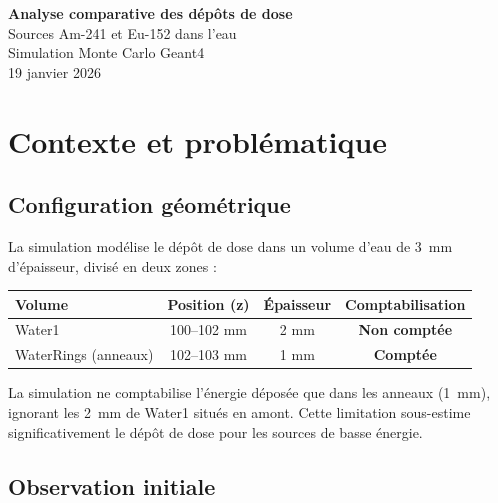 \documentclass[11pt,a4paper]{article}
\begin{document}
\begin{center}
    {\LARGE\bfseries Analyse comparative des dépôts de dose}\\[0.4cm]
    {\Large Sources Am-241 et Eu-152 dans l'eau}\\[0.5cm]
    {\large Simulation Monte Carlo Geant4}\\[0.3cm]
    {\large 19 janvier 2026}
\end{center}

\vspace{0.5cm}

\tableofcontents

\newpage

\section{Contexte et problématique}

\subsection{Configuration géométrique}

La simulation modélise le dépôt de dose dans un volume d'eau de 3~mm d'épaisseur, divisé en deux zones :

\begin{center}
\begin{tabular}{lccc}
\toprule
\rowcolor{headerblue!20}
\textbf{Volume} & \textbf{Position (z)} & \textbf{Épaisseur} & \textbf{Comptabilisation} \\
\midrule
Water1 & 100--102 mm & 2 mm & \textcolor{alertred}{\textbf{Non comptée}} \\
\rowcolor{lightgray}
WaterRings (anneaux) & 102--103 mm & 1 mm & \textcolor{successgreen}{\textbf{Comptée}} \\
\bottomrule
\end{tabular}
\end{center}

\begin{warning}
La simulation ne comptabilise l'énergie déposée que dans les anneaux (1~mm), ignorant les 2~mm de Water1 situés en amont. Cette limitation sous-estime significativement le dépôt de dose pour les sources de basse énergie.
\end{warning}

\subsection{Observation initiale}
\end{document}
